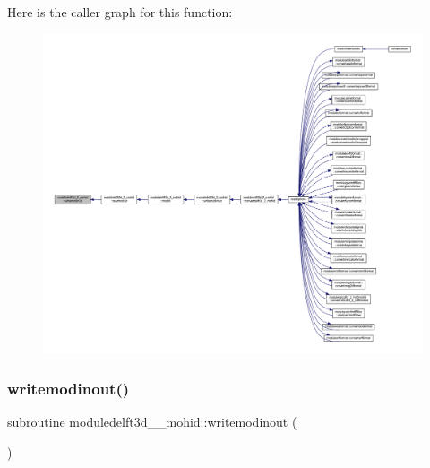 Here is the caller graph for this function\+:\nopagebreak
\begin{figure}[H]
\begin{center}
\leavevmode
\includegraphics[width=350pt]{namespacemoduledelft3d__2__mohid_a5d66acc218cfe348245b89e3e6fac2f2_icgraph}
\end{center}
\end{figure}
\mbox{\label{namespacemoduledelft3d__2__mohid_aec1314b8bd41c0bb55a2be43ece5267d}} 
\subsubsection{\texorpdfstring{writemodinout()}{writemodinout()}}
{\footnotesize\ttfamily subroutine moduledelft3d\+\_\+\_\+mohid\+::writemodinout (\begin{DoxyParamCaption}{ }\end{DoxyParamCaption})\hspace{0.3cm}{\ttfamily [private]}}

